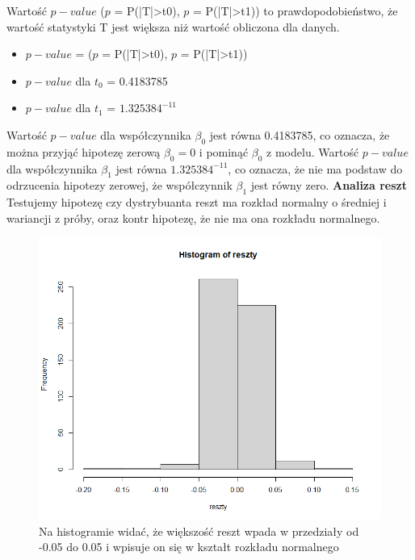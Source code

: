\documentclass[a4paper,11pt]{article}
\def\\{\hfill\break}
\begin{document}
\newpage
 Wartość $p-value$ ($p$ = P(|T|>t0), $p$ = P(|T|>t1)) to prawdopodobieństwo, że wartość statystyki T jest większa niż wartość obliczona dla danych.

\begin{itemize}
\item $p-value$ = ($p$ = P(|T|>t0), $p$ = P(|T|>t1))
\item $p-value$ dla $t_0$ =  0.4183785
\item $p-value$ dla $t_1$ = $1.325384^{-11}$
\end{itemize} 


 Wartość $p-value$ dla współczynnika $\beta_0$ jest równa 0.4183785, co oznacza, że można przyjąć hipotezę zerową $\beta_0=0$ i pominąć $\beta_0$ z modelu. Wartość $p-value$ dla współczynnika $\beta_1$ jest równa $1.325384^{-11}$, co oznacza, że nie ma podstaw do odrzucenia hipotezy zerowej, że współczynnik $\beta_1$ jest równy zero.
 \\\\
\textbf{Analiza reszt}
\\
Testujemy hipotezę czy dystrybuanta reszt ma rozkład normalny o średniej i wariancji z próby, oraz kontr hipotezę, że nie ma ona rozkładu normalnego.

 \begin{figure}[H]
    \includegraphics[width=12cm]{Wykresy/histogram reszty.png}
    \caption{Na histogramie widać, że większość reszt wpada w przedziały od -0.05 do 0.05 i wpisuje on się w kształt rozkładu normalnego}
\end{figure}
\end{document}
